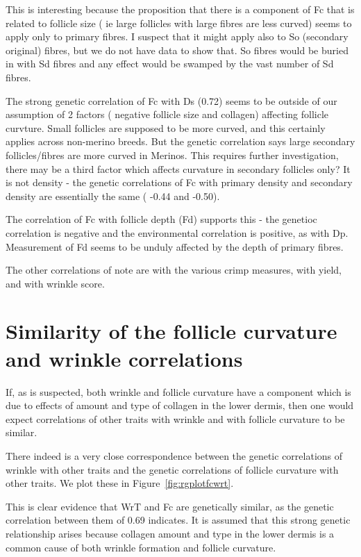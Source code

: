 \documentclass{article}
\begin{document}
This is interesting because the proposition that there is a component of Fc that is related to follicle size  ( ie large follicles with large fibres are less curved) seems to apply only to primary fibres.  I suspect that it might apply also to So (secondary original) fibres, but we do not have data to show that. So fibres would be buried in with Sd fibres and any effect would be swamped by the vast number of Sd fibres.

The strong genetic correlation of Fc with Ds (0.72) seems to be outside of our assumption of 2 factors ( negative follicle size and collagen) affecting follicle curvture. Small follicles are supposed to be more curved, and this certainly applies across non-merino breeds. But the genetic correlation says large secondary follicles/fibres are more curved in Merinos. This requires further investigation, there may be a third factor which affects curvature in secondary follicles only? It is not density - the genetic correlations of Fc with primary density and secondary density are essentially the same ( -0.44 and -0.50). 

The correlation of Fc with follicle depth (Fd) supports this - the genetioc correlation is negative and the environmental correlation is positive, as with Dp. Measurement of Fd seems to be unduly affected by the depth of primary fibres. 

The other correlations of note are with the various crimp measures, with yield, and with wrinkle score.

\section{Similarity of the follicle curvature and wrinkle correlations}
If, as is suspected, both wrinkle and follicle curvature have a component which is due to effects of amount and type of collagen in the lower dermis, then one would expect correlations of other traits with wrinkle and with follicle curvature to be similar. 

There indeed is a very close correspondence between the genetic correlations of wrinkle with other traits and the genetic correlations of follicle curvature with other traits. We plot these in Figure~\ref{fig:rgplotfcwrt}.

This is clear evidence that WrT and Fc are genetically similar, as the genetic correlation between them of 0.69 indicates. It is assumed that this strong genetic relationship arises because collagen amount and type in the lower dermis is a common cause of both wrinkle formation and follicle curvature.
\end{document}
